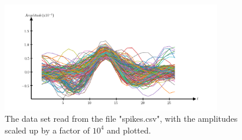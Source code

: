 \documentclass[conference]{IEEEtran}
\begin{document}
\begin{figure}[p!]
\centerline{\includegraphics[trim=30 0 30 0, clip, width=360]{Figure_8.png}}
\caption{The data set read from the file "spikes.csv", with the amplitudes scaled up by a factor of $10^4$ and plotted.}
\label{fig:neuralspikes}
\end{figure}
\end{document}
